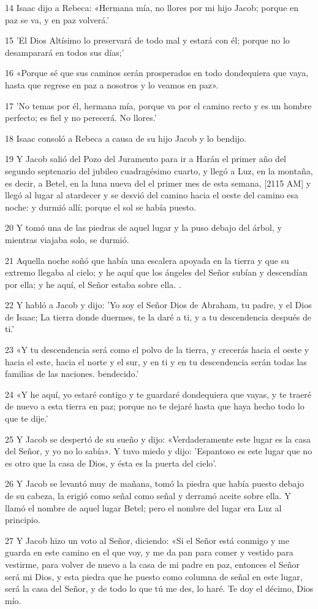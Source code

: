 \par 14 Isaac dijo a Rebeca: «Hermana mía, no llores por mi hijo Jacob; porque en paz se va, y en paz volverá.'
\par 15 'El Dios Altísimo lo preservará de todo mal y estará con él; porque no lo desamparará en todos sus días;'
\par 16 «Porque sé que sus caminos serán prosperados en todo dondequiera que vaya, hasta que regrese en paz a nosotros y lo veamos en paz».
\par 17 'No temas por él, hermana mía, porque va por el camino recto y es un hombre perfecto; es fiel y no perecerá. No llores.'
\par 18 Isaac consoló a Rebeca a causa de su hijo Jacob y lo bendijo.
\par 19 Y Jacob salió del Pozo del Juramento para ir a Harán el primer año del segundo septenario del jubileo cuadragésimo cuarto, y llegó a Luz, en la montaña, es decir, a Betel, en la luna nueva del el primer mes de esta semana, [2115 AM] y llegó al lugar al atardecer y se desvió del camino hacia el oeste del camino esa noche: y durmió allí; porque el sol se había puesto.
\par 20 Y tomó una de las piedras de aquel lugar y la puso debajo del árbol, y mientras viajaba solo, se durmió.
\par 21 Aquella noche soñó que había una escalera apoyada en la tierra y que su extremo llegaba al cielo; y he aquí que los ángeles del Señor subían y descendían por ella; y he aquí, el Señor estaba sobre ella. .
\par 22 Y habló a Jacob y dijo: 'Yo soy el Señor Dios de Abraham, tu padre, y el Dios de Isaac; La tierra donde duermes, te la daré a ti, y a tu descendencia después de ti.'
\par 23 «Y tu descendencia será como el polvo de la tierra, y crecerás hacia el oeste y hacia el este, hacia el norte y el sur, y en ti y en tu descendencia serán todas las familias de las naciones. bendecido.'
\par 24 «Y he aquí, yo estaré contigo y te guardaré dondequiera que vayas, y te traeré de nuevo a esta tierra en paz; porque no te dejaré hasta que haya hecho todo lo que te dije.'
\par 25 Y Jacob se despertó de su sueño y dijo: «Verdaderamente este lugar es la casa del Señor, y yo no lo sabía». Y tuvo miedo y dijo: 'Espantoso es este lugar que no es otro que la casa de Dios, y ésta es la puerta del cielo'.
\par 26 Y Jacob se levantó muy de mañana, tomó la piedra que había puesto debajo de su cabeza, la erigió como señal como señal y derramó aceite sobre ella. Y llamó el nombre de aquel lugar Betel; pero el nombre del lugar era Luz al principio.
\par 27 Y Jacob hizo un voto al Señor, diciendo: «Si el Señor está conmigo y me guarda en este camino en el que voy, y me da pan para comer y vestido para vestirme, para volver de nuevo a la casa de mi padre en paz, entonces el Señor será mi Dios, y esta piedra que he puesto como columna de señal en este lugar, será la casa del Señor, y de todo lo que tú me des, lo haré. Te doy el décimo, Dios mío.

